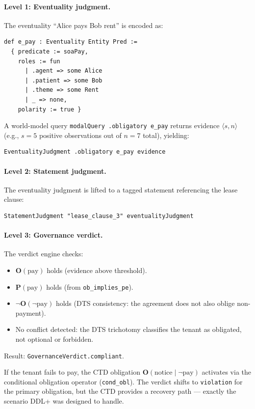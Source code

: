 \documentclass[]{article}
\newcommand{\code}[1]{\texttt{#1}}
\newcommand{\OB}{\ensuremath{\mathbf{O}}}
\newcommand{\PE}{\ensuremath{\mathbf{P}}}
\newcommand{\DDL}{\textup{DDL+}}
\newcommand{\DTS}{\textup{DTS}}
\begin{document}
\paragraph{Level 1: Eventuality judgment.}
The eventuality ``Alice pays Bob rent'' is encoded as:
\begin{lstlisting}
def e_pay : Eventuality Entity Pred :=
  { predicate := soaPay,
    roles := fun
      | .agent => some Alice
      | .patient => some Bob
      | .theme => some Rent
      | _ => none,
    polarity := true }
\end{lstlisting}
A world-model query \code{modalQuery .obligatory e\_pay} returns evidence
$\langle s, n \rangle$ (e.g., $s=5$ positive observations out of $n=7$ total),
yielding:
\begin{lstlisting}
EventualityJudgment .obligatory e_pay evidence
\end{lstlisting}

\paragraph{Level 2: Statement judgment.}
The eventuality judgment is lifted to a tagged statement referencing
the lease clause:
\begin{lstlisting}
StatementJudgment "lease_clause_3" eventualityJudgment
\end{lstlisting}

\paragraph{Level 3: Governance verdict.}
The verdict engine checks:
\begin{itemize}
\item $\OB(\text{pay})$ holds (evidence above threshold).
\item $\PE(\text{pay})$ holds (from \code{ob\_implies\_pe}).
\item $\neg\OB(\neg\text{pay})$ holds (\DTS{} consistency: the agreement
      does not also oblige non-payment).
\item No conflict detected: the \DTS{} trichotomy classifies the tenant
      as obligated, not optional or forbidden.
\end{itemize}
Result: \code{GovernanceVerdict.compliant}.

If the tenant fails to pay, the CTD obligation $\OB(\text{notice} \mid \neg\text{pay})$
activates via the conditional obligation operator (\code{cond\_obl}).
The verdict shifts to \code{violation} for the primary obligation, but the
CTD provides a recovery path --- exactly the scenario \DDL{} was designed to handle.
\end{document}

